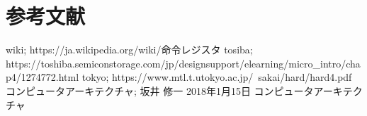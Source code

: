 \documentclass[a4paper,11pt,titlepage]{jarticle}
\begin{document}
  \section{参考文献}
  \begin{thebibliography}{99}
  	wiki; https://ja.wikipedia.org/wiki/命令レジスタ
  	tosiba; https://toshiba.semicon\-storage.com/jp/design\-support/e\-learning/micro\_intro/chap4/1274772.html
  	tokyo; https://www.mtl.t.u\-tokyo.ac.jp/~sakai/hard/hard4.pdf
  	コンピュータアーキテクチャ; 坂井 修一  2018年1月15日 コンピュータアーキテクチャ
  \end{thebibliography}
  
\end{document}
